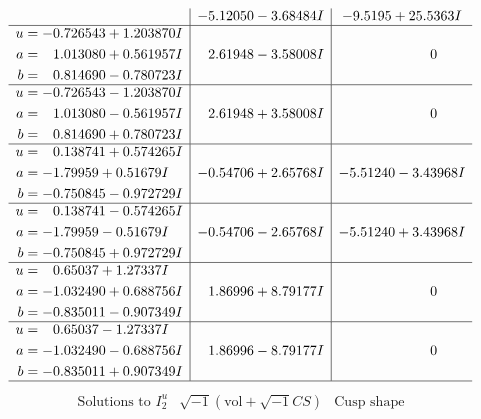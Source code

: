 \documentclass[1p]{elsarticle_modified}
\theoremstyle{definition}
\newcommand{\I}{\sqrt{-1}}
\begin{document}
$$\begin{array}{c|c|c}
 & -5.12050 - 3.68484 I & -9.5195 + 25.5363 I \\ \hline\begin{aligned}
u &= -0.726543 + 1.203870 I \\
a &= \phantom{-}1.013080 + 0.561957 I \\
b &= \phantom{-}0.814690 - 0.780723 I\end{aligned}
 & \phantom{-}2.61948 - 3.58008 I & \phantom{-0.000000 } 0 \\ \hline\begin{aligned}
u &= -0.726543 - 1.203870 I \\
a &= \phantom{-}1.013080 - 0.561957 I \\
b &= \phantom{-}0.814690 + 0.780723 I\end{aligned}
 & \phantom{-}2.61948 + 3.58008 I & \phantom{-0.000000 } 0 \\ \hline\begin{aligned}
u &= \phantom{-}0.138741 + 0.574265 I \\
a &= -1.79959 + 0.51679 I \\
b &= -0.750845 - 0.972729 I\end{aligned}
 & -0.54706 + 2.65768 I & -5.51240 - 3.43968 I \\ \hline\begin{aligned}
u &= \phantom{-}0.138741 - 0.574265 I \\
a &= -1.79959 - 0.51679 I \\
b &= -0.750845 + 0.972729 I\end{aligned}
 & -0.54706 - 2.65768 I & -5.51240 + 3.43968 I \\ \hline\begin{aligned}
u &= \phantom{-}0.65037 + 1.27337 I \\
a &= -1.032490 + 0.688756 I \\
b &= -0.835011 - 0.907349 I\end{aligned}
 & \phantom{-}1.86996 + 8.79177 I & \phantom{-0.000000 } 0 \\ \hline\begin{aligned}
u &= \phantom{-}0.65037 - 1.27337 I \\
a &= -1.032490 - 0.688756 I \\
b &= -0.835011 + 0.907349 I\end{aligned}
 & \phantom{-}1.86996 - 8.79177 I & \phantom{-0.000000 } 0\\
 \hline 
 \end{array}$$\newpage$$\begin{array}{c|c|c}  
\text{Solutions to }I^u_{2}& \I (\text{vol} + \sqrt{-1}CS) & \text{Cusp shape}\\

\end{array}$$
\end{document}
